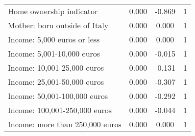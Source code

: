 \begin{table}[htbp]
\begin{tabular}{l*{1}{ccc}}
Home ownership indicator&       0.000         &      -0.869&           1\\
Mother: born outside of Italy&       0.000         &       0.000&           1\\
Income: 5,000 euros or less&       0.000         &       0.000&           1\\
Income: 5,001-10,000 euros&       0.000         &      -0.015&           1\\
Income: 10,001-25,000 euros&       0.000         &      -0.131&           1\\
Income: 25,001-50,000 euros&       0.000         &      -0.307&           1\\
Income: 50,001-100,000 euros&       0.000         &      -0.292&           1\\
Income: 100,001-250,000 euros&       0.000         &      -0.044&           1\\
Income: more than 250,000 euros&       0.000         &       0.000&           1\\
\bottomrule
\end{tabular}
\end{table}
